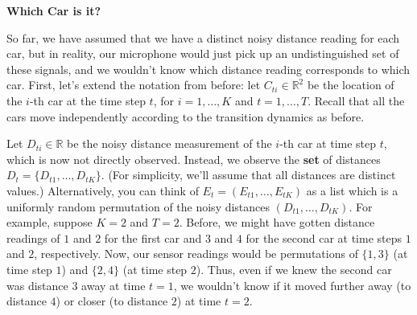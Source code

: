 \item {\bf Which Car is it?}

So far, we have assumed that we have a distinct noisy distance reading for each
car, but in reality, our microphone would just pick up an undistinguished set of
these signals, and we wouldn't know which distance reading corresponds to which
car. First, let's extend the notation from before: let $C_{ti} \in \mathbb R^2$
be the location of the $i$-th car at the time step $t$, for $i = 1, \dots, K$
and $t = 1, \dots, T$. Recall that all the cars move independently according to
the transition dynamics as before.

Let $D_{ti} \in \mathbb R$ be the noisy distance measurement of the $i$-th car
at time step $t$, which is now not directly observed. Instead, we observe the
{\bf set} of distances $D_t = \{ D_{t1}, \dots, D_{tK} \}$.  (For simplicity,
we'll assume that all distances are distinct values.) Alternatively, you can
think of $E_t = (E_{t1}, \dots, E_{tK})$ as a list which is a uniformly random
permutation of the noisy distances $(D_{t1}, \dots, D_{tK})$. For example,
suppose $K=2$ and $T = 2$. Before, we might have gotten distance readings of $1$
and $2$ for the first car and $3$ and $4$ for the second car at time steps $1$
and $2$, respectively. Now, our sensor readings would be permutations of $\{1,
3\}$ (at time step $1$) and $\{2, 4\}$ (at time step $2$). Thus, even if we knew
the second car was distance $3$ away at time $t = 1$, we wouldn't know if it
moved further away (to distance $4$) or closer (to distance $2$) at time $t =
2$.

\begin{enumerate}

  

  

  

\end{enumerate}
